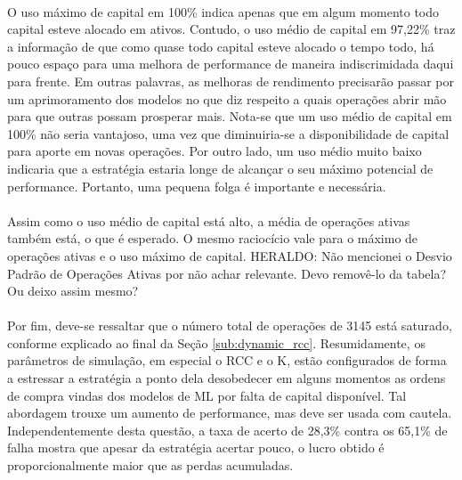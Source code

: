 \paragraph{} O uso máximo de capital em 100\% indica apenas que em algum momento todo capital esteve alocado em ativos. Contudo, o uso médio de capital em 97,22\% traz a informação de que como quase todo capital esteve alocado o tempo todo, há pouco espaço para uma melhora de performance de maneira indiscrimidada daqui para frente. Em outras palavras, as melhoras de rendimento precisarão passar por um aprimoramento dos modelos no que diz respeito a quais operações abrir mão para que outras possam prosperar mais. Nota-se que um uso médio de capital em 100\% não seria vantajoso, uma vez que diminuiria-se a disponibilidade de capital para aporte em novas operações. Por outro lado, um uso médio muito baixo indicaria que a estratégia estaria longe de alcançar o seu máximo potencial de performance. Portanto, uma pequena folga é importante e necessária.

\paragraph{} Assim como o uso médio de capital está alto, a média de operações ativas também está, o que é esperado. O mesmo raciocício vale para o máximo de operações ativas e o uso máximo de capital. \color{red} HERALDO: Não mencionei o Desvio Padrão de Operações Ativas por não achar relevante. Devo removê-lo da tabela? Ou deixo assim mesmo? \color{black}

\paragraph{} Por fim, deve-se ressaltar que o número total de operações de 3145 está saturado, conforme explicado ao final da Seção \ref{sub:dynamic_rcc}. Resumidamente, os parâmetros de simulação, em especial o RCC e o K, estão configurados de forma a estressar a estratégia a ponto dela desobedecer em alguns momentos as ordens de compra vindas dos modelos de ML por falta de capital disponível. Tal abordagem trouxe um aumento de performance, mas deve ser usada com cautela. Independentemente desta questão, a taxa de acerto de 28,3\% contra os 65,1\% de falha mostra que apesar da estratégia acertar pouco, o lucro obtido é proporcionalmente maior que as perdas acumuladas.